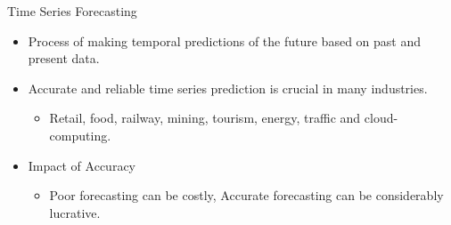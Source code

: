 \documentclass{beamer}
\begin{document}
\begin{frame}{Time Series Forecasting}
\begin{itemize}
\item Process of making temporal predictions of the future based on past and present data.
\vspace{3mm}
\item Accurate and reliable time series prediction is crucial in many industries.
\begin{itemize}
\vspace{2mm}
\item \color{blue} Retail, food, railway, mining, tourism, energy, traffic and cloud-computing.  
\end{itemize}
\vspace{3mm}
\item Impact of Accuracy
\begin{itemize}
\vspace{2mm}
\item \color{blue} Poor forecasting can be costly, Accurate forecasting can be considerably lucrative.
\end{itemize}
 \end{itemize}
\end{frame}

\end{document}
